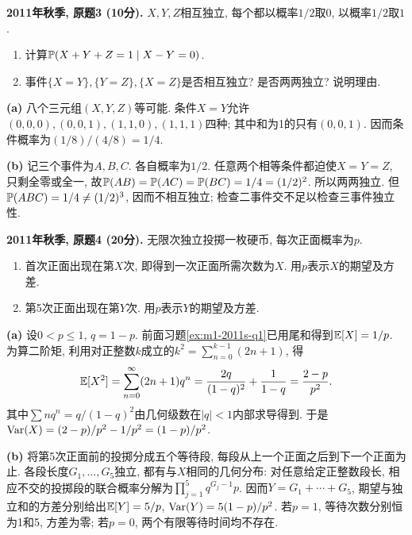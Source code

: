 \begin{exercise}\label{ex:m1-2011f-q3}
\textbf{2011年秋季, 原题3 (10分).} $X,Y,Z$相互独立, 每个都以概率$1/2$取$0$, 以概率$1/2$取$1$.
\begin{enumerate}\item[(a)]\label{ex:m1-2011f-q3-a} 计算$\mathbb P(X+Y+Z=1\mid X-Y=0)$.\item[(b)]\label{ex:m1-2011f-q3-b} 事件$\{X=Y\},\{Y=Z\},\{X=Z\}$是否相互独立? 是否两两独立? 说明理由.\end{enumerate}
\end{exercise}
\begin{solution}
\textbf{(a)}\label{sol:m1-2011f-q3-a} 八个三元组$(X,Y,Z)$等可能. 条件$X=Y$允许$(0,0,0),(0,0,1),(1,1,0),(1,1,1)$四种; 其中和为1的只有$(0,0,1)$. 因而条件概率为$(1/8)/(4/8)=1/4$.

\textbf{(b)}\label{sol:m1-2011f-q3-b} 记三个事件为$A,B,C$. 各自概率为$1/2$. 任意两个相等条件都迫使$X=Y=Z$, 只剩全零或全一, 故$\mathbb P(AB)=\mathbb P(AC)=\mathbb P(BC)=1/4=(1/2)^2$. 所以两两独立. 但$\mathbb P(ABC)=1/4\ne(1/2)^3$, 因而不相互独立; 检查二事件交不足以检查三事件独立性.
\end{solution}

\begin{exercise}\label{ex:m1-2011f-q4}
\textbf{2011年秋季, 原题4 (20分).} 无限次独立投掷一枚硬币, 每次正面概率为$p$.
\begin{enumerate}\item[(a)]\label{ex:m1-2011f-q4-a} 首次正面出现在第$X$次, 即得到一次正面所需次数为$X$. 用$p$表示$X$的期望及方差.\item[(b)]\label{ex:m1-2011f-q4-b} 第5次正面出现在第$Y$次. 用$p$表示$Y$的期望及方差.\end{enumerate}
\end{exercise}
\begin{solution}
\textbf{(a)}\label{sol:m1-2011f-q4-a} 设$0<p\le1$, $q=1-p$. 前面习题\ref{ex:m1-2011s-q1}已用尾和得到$\mathbb E[X]=1/p$. 为算二阶矩, 利用对正整数$k$成立的$k^2=\sum_{n=0}^{k-1}(2n+1)$, 得
\[
\mathbb E[X^2]=\sum_{n=0}^{\infty}(2n+1)q^n
=\frac{2q}{(1-q)^2}+\frac1{1-q}
=\frac{2-p}{p^2}.
\]
其中$\sum nq^n=q/(1-q)^2$由几何级数在$|q|<1$内部求导得到. 于是$\operatorname{Var}(X)=(2-p)/p^2-1/p^2=(1-p)/p^2$.

\textbf{(b)}\label{sol:m1-2011f-q4-b} 将第5次正面前的投掷分成五个等待段, 每段从上一个正面之后到下一个正面为止. 各段长度$G_1,\ldots,G_5$独立, 都有与$X$相同的几何分布: 对任意给定正整数段长, 相应不交的投掷段的联合概率分解为$\prod_{j=1}^5q^{G_j-1}p$. 因而$Y=G_1+\cdots+G_5$, 期望与独立和的方差分别给出$\mathbb E[Y]=5/p$, $\operatorname{Var}(Y)=5(1-p)/p^2$. 若$p=1$, 等待次数分别恒为1和5, 方差为零; 若$p=0$, 两个有限等待时间均不存在.
\end{solution}

